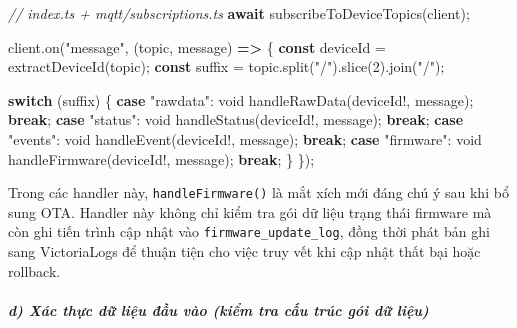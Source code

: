 \documentclass[a4paper]{extarticle}
\newenvironment{Shaded}{}{}
\newcommand{\CommentTok}[1]{\textcolor[rgb]{0.38,0.63,0.69}{\textit{#1}}}
\newcommand{\ControlFlowTok}[1]{\textcolor[rgb]{0.00,0.44,0.13}{\textbf{#1}}}
\newcommand{\DataTypeTok}[1]{\textcolor[rgb]{0.56,0.13,0.00}{#1}}
\newcommand{\DecValTok}[1]{\textcolor[rgb]{0.25,0.63,0.44}{#1}}
\newcommand{\FunctionTok}[1]{\textcolor[rgb]{0.02,0.16,0.49}{#1}}
\newcommand{\KeywordTok}[1]{\textcolor[rgb]{0.00,0.44,0.13}{\textbf{#1}}}
\newcommand{\NormalTok}[1]{#1}
\newcommand{\OperatorTok}[1]{\textcolor[rgb]{0.40,0.40,0.40}{#1}}
\newcommand{\StringTok}[1]{\textcolor[rgb]{0.25,0.44,0.63}{#1}}
\begin{document}
\begin{Shaded}
\begin{Highlighting}[]
\CommentTok{// index.ts + mqtt/subscriptions.ts}
\ControlFlowTok{await} \FunctionTok{subscribeToDeviceTopics}\NormalTok{(client)}\OperatorTok{;}

\NormalTok{client}\OperatorTok{.}\FunctionTok{on}\NormalTok{(}\StringTok{"message"}\OperatorTok{,}\NormalTok{ (topic}\OperatorTok{,}\NormalTok{ message) }\KeywordTok{=\textgreater{}}\NormalTok{ \{}
  \KeywordTok{const}\NormalTok{ deviceId }\OperatorTok{=} \FunctionTok{extractDeviceId}\NormalTok{(topic)}\OperatorTok{;}
  \KeywordTok{const}\NormalTok{ suffix }\OperatorTok{=}\NormalTok{ topic}\OperatorTok{.}\FunctionTok{split}\NormalTok{(}\StringTok{"/"}\NormalTok{)}\OperatorTok{.}\FunctionTok{slice}\NormalTok{(}\DecValTok{2}\NormalTok{)}\OperatorTok{.}\FunctionTok{join}\NormalTok{(}\StringTok{"/"}\NormalTok{)}\OperatorTok{;}

  \ControlFlowTok{switch}\NormalTok{ (suffix) \{}
    \ControlFlowTok{case} \StringTok{"rawdata"}\OperatorTok{:}
      \DataTypeTok{void} \FunctionTok{handleRawData}\NormalTok{(deviceId}\OperatorTok{!,}\NormalTok{ message)}\OperatorTok{;}
      \ControlFlowTok{break}\OperatorTok{;}
    \ControlFlowTok{case} \StringTok{"status"}\OperatorTok{:}
      \DataTypeTok{void} \FunctionTok{handleStatus}\NormalTok{(deviceId}\OperatorTok{!,}\NormalTok{ message)}\OperatorTok{;}
      \ControlFlowTok{break}\OperatorTok{;}
    \ControlFlowTok{case} \StringTok{"events"}\OperatorTok{:}
      \DataTypeTok{void} \FunctionTok{handleEvent}\NormalTok{(deviceId}\OperatorTok{!,}\NormalTok{ message)}\OperatorTok{;}
      \ControlFlowTok{break}\OperatorTok{;}
    \ControlFlowTok{case} \StringTok{"firmware"}\OperatorTok{:}
      \DataTypeTok{void} \FunctionTok{handleFirmware}\NormalTok{(deviceId}\OperatorTok{!,}\NormalTok{ message)}\OperatorTok{;}
      \ControlFlowTok{break}\OperatorTok{;}
\NormalTok{  \}}
\NormalTok{\})}\OperatorTok{;}
\end{Highlighting}
\end{Shaded}

Trong các handler này, \texttt{handleFirmware()} là mắt xích mới đáng
chú ý sau khi bổ sung OTA. Handler này không chỉ kiểm tra gói dữ liệu trạng
thái firmware mà còn ghi tiến trình cập nhật vào
\texttt{firmware\_update\_log}, đồng thời phát bản ghi sang VictoriaLogs
để thuận tiện cho việc truy vết khi cập nhật thất bại hoặc rollback.

\subparagraph{d) Xác thực dữ liệu đầu vào (kiểm tra cấu trúc gói dữ
liệu)}\label{d-xuxe1c-thux1ef1c-dux1eef-liux1ec7u-ux111ux1ea7u-vuxe0o-payload-validation}
\end{document}
